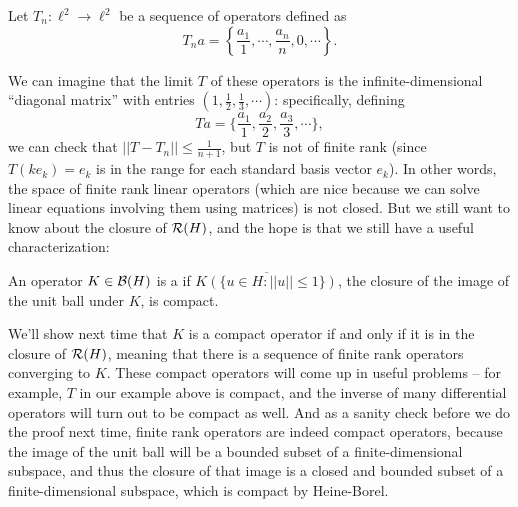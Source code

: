\begin{example}
Let $T_n: \ell^2 \to \ell^2$ be a sequence of operators defined as 
\[
    T_n a = \left\{\frac{a_1}{1}, \cdots, \frac{a_n}{n}, 0, \cdots\right\}.
\]
\end{example}

We can imagine that the limit $T$ of these operators is the infinite-dimensional ``diagonal matrix'' with entries $(1, \frac{1}{2}, \frac{1}{3}, \cdots)$: specifically, defining
\[
    Ta = \{\frac{a_1}{1}, \frac{a_2}{2}, \frac{a_3}{3}, \cdots\},
\]
we can check that $||T - T_n|| \le \frac{1}{n+1}$, but $T$ is not of finite rank (since $T(ke_k) = e_k$ is in the range for each standard basis vector $e_k$). In other words, the space of finite rank linear operators (which are nice because we can solve linear equations involving them using matrices) is not closed. But we still want to know about the closure of $\mathcal{R}(H)$, and the hope is that we still have a useful characterization:

\begin{definition}
An operator $K \in \mathcal{B}(H)$ is a  if $\overline{K(\{u \in H: ||u|| \le 1\})}$, the closure of the image of the unit ball under $K$, is compact.
\end{definition}

We'll show next time that $K$ is a compact operator if and only if it is in the closure of $\mathcal{R}(H)$, meaning that there is a sequence of finite rank operators converging to $K$. These compact operators will come up in useful problems -- for example, $T$ in our example above is compact, and the inverse of many differential operators will turn out to be compact as well. And as a sanity check before we do the proof next time, finite rank operators are indeed compact operators, because the image of the unit ball will be a bounded subset of a finite-dimensional subspace, and thus the closure of that image is a closed and bounded subset of a finite-dimensional subspace, which is compact by Heine-Borel.